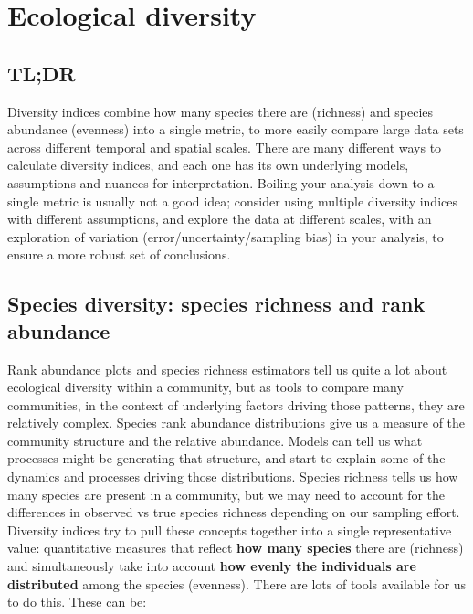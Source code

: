 \documentclass[
  letterpaper,
  DIV=11,
  numbers=noendperiod]{scrreprt}
\begin{document}
\chapter{Ecological diversity}\label{sec-ecological-diversity}

\section{TL;DR}\label{tldr-1}

Diversity indices combine how many species there are (richness) and
species abundance (evenness) into a single metric, to more easily
compare large data sets across different temporal and spatial scales.
There are many different ways to calculate diversity indices, and each
one has its own underlying models, assumptions and nuances for
interpretation. Boiling your analysis down to a single metric is usually
not a good idea; consider using multiple diversity indices with
different assumptions, and explore the data at different scales, with an
exploration of variation (error/uncertainty/sampling bias) in your
analysis, to ensure a more robust set of conclusions.

\section{Species diversity: species richness and rank
abundance}\label{species-diversity-species-richness-and-rank-abundance}

Rank abundance plots and species richness estimators tell us quite a lot
about ecological diversity within a community, but as tools to compare
many communities, in the context of underlying factors driving those
patterns, they are relatively complex. Species rank abundance
distributions give us a measure of the community structure and the
relative abundance. Models can tell us what processes might be
generating that structure, and start to explain some of the dynamics and
processes driving those distributions. Species richness tells us how
many species are present in a community, but we may need to account for
the differences in observed vs true species richness depending on our
sampling effort. Diversity indices try to pull these concepts together
into a single representative value: quantitative measures that reflect
\textbf{how many species} there are (richness) and simultaneously take
into account \textbf{how evenly the individuals are distributed} among
the species (evenness). There are lots of tools available for us to do
this. These can be:
\end{document}
